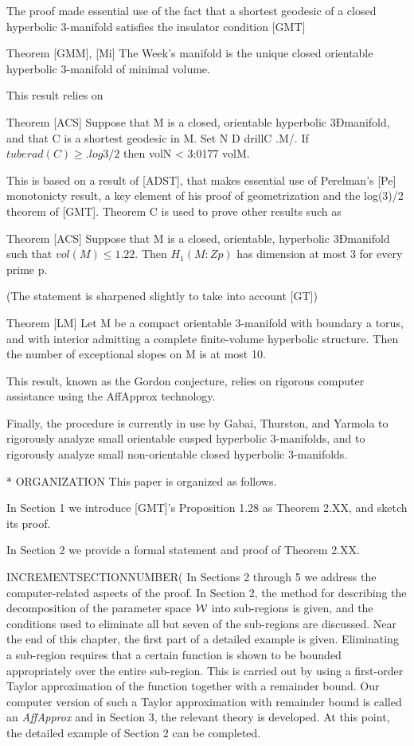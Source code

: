The proof made essential use of the fact that a shortest geodesic of a closed hyperbolic 3-manifold satisfies the insulator condition [GMT]

Theorem [GMM], [Mi] The Week's manifold is the
unique closed orientable hyperbolic 3-manifold of minimal volume.

This result relies on 

Theorem  [ACS] Suppose that M is a closed, orientable hyperbolic 3Ðmanifold,
and that C is a shortest geodesic in M.
Set N D drillC .M/. If $tuberad(C) \ge .log 3/2$ then
volN < 3:0177 volM.

This is based on a result of [ADST], that makes essential use of Perelman's [Pe] monotonicty result, a key element of his proof of geometrization and the log(3)/2 theorem of [GMT].  Theorem C is used to prove other results such as 

Theorem [ACS] Suppose that M is a closed, orientable, hyperbolic
3Ðmanifold such that $vol(M)\le 1.22$.
Then $H_1(M:Zp)$ has dimension at most 3 for every prime p.

(The statement is sharpened slightly to take into account [GT])

Theorem [LM] Let M be a compact orientable 3-manifold with boundary a
torus, and with interior admitting a complete finite-volume hyperbolic structure.
Then the number of exceptional slopes on M is at most 10.

This result, known as the Gordon conjecture, relies on rigorous computer assistance using the AffApprox technology.

Finally, the procedure is currently in use by Gabai, Thurston, and Yarmola
to rigorously analyze small orientable cusped hyperbolic $3$-manifolds,
and to rigorously analyze small non-orientable closed hyperbolic $3$-manifolds.

* ORGANIZATION
This paper is organized as follows.  

In Section 1 we introduce [GMT]'s Proposition 1.28 as Theorem 2.XX, and sketch its proof.

In Section 2 we provide a formal statement and proof of Theorem 2.XX.

INCREMENTSECTIONNUMBER(
In Sections 2 through 5 we address the computer-related aspects of the 
proof.   In Section 2, the method for describing the decomposition of the 
parameter space ${\cal W}$ into sub-regions is given, and the conditions 
used to eliminate all but seven of the sub-regions are discussed.  Near the 
end of this chapter, the first part of a detailed example is given.  Eliminating 
a sub-region requires that a certain function is shown to be bounded 
appropriately over the entire sub-region.  This is carried out by using a 
first-order Taylor approximation of the function together with a 
remainder 
bound.  Our computer version of such a Taylor approximation with remainder bound 
is called an {\it AffApprox} and in Section 3, the relevant theory is 
developed.  At this point, the detailed example of Section 2 can be 
completed.

